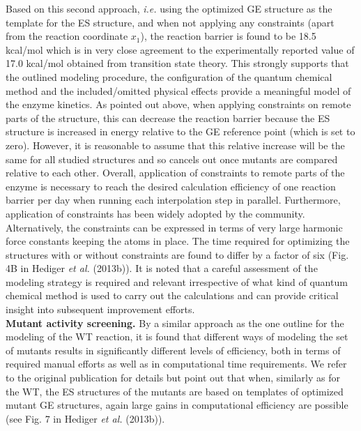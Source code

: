 Based on this second approach, \textit{i.e.} using the optimized GE structure as the template for the ES structure, and when not applying any constraints (apart from the reaction coordinate $x_1$), the reaction barrier is found to be 18.5 kcal/mol which is in very close agreement to the experimentally reported value of 17.0 kcal/mol obtained from transition state theory\cite{joshi2000hydrogen}.
This strongly supports that the outlined modeling procedure, the configuration of the quantum chemical method and the included/omitted physical effects provide a meaningful model of the enzyme kinetics.
As pointed out above, when applying constraints on remote parts of the structure, this can decrease the reaction barrier because the ES structure is increased in energy relative to the GE reference point (which is set to zero).
However, it is reasonable to assume that this relative increase will be the same for all studied structures and so cancels out once mutants are compared relative to each other.  
Overall, application of constraints to remote parts of the enzyme is necessary to reach the desired calculation efficiency of one reaction barrier per day when running each interpolation step in parallel.
Furthermore, application of constraints has been widely adopted by the community\cite{himo2006quantum,siegbahn2009recent,liao2012comparison,lonsdale2013quantum}.
Alternatively, the constraints can be expressed in terms of very large harmonic force constants keeping the atoms in place.
The time required for optimizing the structures with or without constraints are found to differ by a factor of six (Fig. 4B in Hediger \textit{et al.} (2013b)).
It is noted that a careful assessment of the modeling strategy is required and relevant irrespective of what kind of quantum chemical method is used to carry out the calculations and can provide critical insight into subsequent improvement efforts.\\
\textbf{Mutant activity screening.}
By a similar approach as the one outline for the modeling of the WT reaction, it is found that different ways of modeling the set of mutants results in significantly different levels of efficiency, both in terms of required manual efforts as well as in computational time requirements.
We refer to the original publication for details\cite{hediger2013computational} but point out that when, similarly as for the WT, the ES structures of the mutants are based on templates of optimized mutant GE structures, again large gains in computational efficiency are possible (see Fig. 7 in Hediger \textit{et al.} (2013b)).\\
